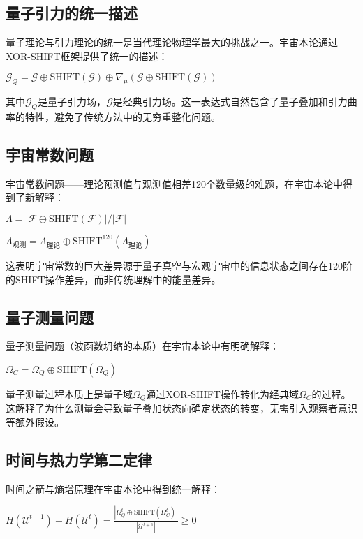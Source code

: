 \subsection{量子引力的统一描述}

量子理论与引力理论的统一是当代理论物理学最大的挑战之一。宇宙本论通过XOR-SHIFT框架提供了统一的描述：

$\mathcal{G}_Q = \mathcal{G} \oplus \text{SHIFT}(\mathcal{G}) \oplus \nabla_{\mu}(\mathcal{G} \oplus \text{SHIFT}(\mathcal{G}))$

其中$\mathcal{G}_Q$是量子引力场，$\mathcal{G}$是经典引力场。这一表达式自然包含了量子叠加和引力曲率的特性，避免了传统方法中的无穷重整化问题。

\subsection{宇宙常数问题}

宇宙常数问题——理论预测值与观测值相差120个数量级的难题，在宇宙本论中得到了新解释：

$\Lambda = |\mathcal{F} \oplus \text{SHIFT}(\mathcal{F})| / |\mathcal{F}|$

$\Lambda_{\text{观测}} = \Lambda_{\text{理论}} \oplus \text{SHIFT}^{120}(\Lambda_{\text{理论}})$

这表明宇宙常数的巨大差异源于量子真空与宏观宇宙中的信息状态之间存在120阶的SHIFT操作差异，而非传统理解中的能量差异。

\subsection{量子测量问题}

量子测量问题（波函数坍缩的本质）在宇宙本论中有明确解释：

$\Omega_C = \Omega_Q \oplus \text{SHIFT}(\Omega_Q)$

量子测量过程本质上是量子域$\Omega_Q$通过XOR-SHIFT操作转化为经典域$\Omega_C$的过程。这解释了为什么测量会导致量子叠加状态向确定状态的转变，无需引入观察者意识等额外假设。

\subsection{时间与热力学第二定律}

时间之箭与熵增原理在宇宙本论中得到统一解释：

$H(\mathcal{U}^{t+1}) - H(\mathcal{U}^{t}) = \frac{|\Omega_Q^{t} \oplus \text{SHIFT}(\Omega_C^{t})|}{|\mathcal{U}^{t+1}|} \geq 0$


